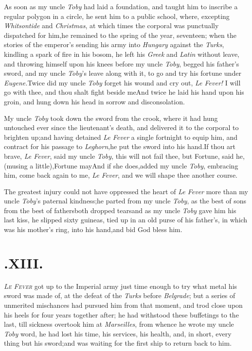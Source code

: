 \documentclass{article}
\begin{document}
As soon as my uncle \textit{Toby} had laid a foundation, and
taught him to inscribe a regular polygon in a circle, he sent him
to a public school, where, excepting \textit{Whitsontide} and
\textit{Christmas}, at which times the corporal was punctually
dispatched for him,\tsk he remained to the spring of the year,
seventeen; when the stories of the emperor’s sending his army
into \textit{Hungary} against the \textit{Turks}, kindling a spark of
fire in his bosom, he left his \textit{Greek} and \textit{Latin}
without leave, and throwing himself upon his knees before my uncle
\textit{Toby}, begged his father’s sword, and my uncle
\textit{Toby}’s leave along with it, to go and try his fortune
under \textit{Eugene.}\tsk Twice did my uncle \textit{Toby} forget
his wound and cry out, \textit{Le Fever!} I will go with thee, and
thou shalt fight beside me\tsh And twice he laid his hand
upon his groin, and hung down his head in sorrow and
disconsolation.\tsh

My uncle \textit{Toby} took down the sword from the
crook, where it had hung untouched ever since the
lieutenant’s death, and delivered it to the corporal to
brighten up;\tsh and having detained \textit{Le Fever} a
single fortnight to equip him, and contract for his passage to
\textit{Leghorn},\break\tsk he put the sword into his
hand.\tsh If thou art brave, \textit{Le Fever}, said my
uncle \textit{Toby}, this will not fail thee,\tsh{} but
Fortune, said he, (musing a little),\break\tsh Fortune
may\tsh And if she does,\break\tsk added my uncle \textit{Toby},
embracing him, come back again to me, \textit{Le Fever}, and we will
shape thee another course.

The greatest injury could not have oppressed the heart of \textit{Le
Fever} more than my uncle \textit{Toby}’s paternal
kindness;\tsh he parted from my uncle \textit{Toby}, as the
best of sons from the best of fathers\tsh both dropped
tears\tsh and as my uncle \textit{Toby} gave him his last
kiss, he slipped sixty guineas, tied up in an old purse of his
father’s, in which was his mother’s ring, into his
hand,\tsk and bid God bless him.

\vfill{}\eject
\section{.\enspace XIII.}

\lettrine{\itshape L}{\itshape e Fever} got up to the
Imperial army just time enough to try what metal his sword was made
of, at the defeat of the \textit{Turks} before \textit{Belgrade}; but a
series of unmerited mischances had pursued him from that moment,
and trod close upon his heels for four years together after; he had
withstood these buffetings to the last, till sickness overtook him
at \textit{Marseilles}, from whence he wrote my uncle \textit{Toby}
word, he had lost his time, his services, his health, and, in
short, every thing but his sword;\tsh and was waiting for
the first ship to return back to him.
\end{document}

